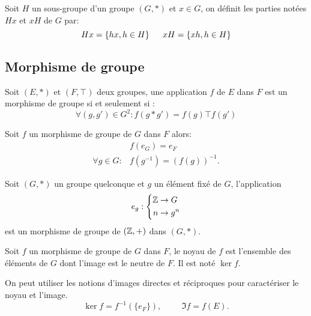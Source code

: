 \begin{defi}[Notations $Hx$ et $xH$.]
  Soit $H$ un sous-groupe d'un groupe $(G,*)$ et $x\in G$, on définit les parties notées $Hx$ et $xH$ de $G$ par:
\begin{displaymath}
  Hx = \left\lbrace hx, h\in H\right\rbrace \hspace{0.5cm} xH = \left\lbrace xh, h\in H\right\rbrace
\end{displaymath}
\end{defi}


\subsection{Morphisme de groupe}
\begin{defi}
 Soit $(E,*)$ et $(F,\top)$ deux groupes, une application $f$ de $E$ dans $F$ est un morphisme de groupe si et seulement si :
\begin{displaymath}
 \forall(g,g')\in G^2 : f(g*g') = f(g) \top f(g')
\end{displaymath}
\end{defi}
\begin{prop}
 Soit $f$ un morphisme de groupe de $G$ dans $F$ alors:
\begin{align*}
    &f(e_G) = e_F \\
 \forall g\in G: &f(g^{-1}) = (f(g))^{-1}.
\end{align*}
\end{prop}
\begin{exple}
 Soit $(G,*)$ un groupe quelconque et $g$ un élément fixé de $G$, l'application
\begin{displaymath}
e_g : \left\lbrace 
\begin{aligned}
 \mathbb{Z} &\rightarrow G \\
 n &\rightarrow g^n
\end{aligned}
\right. 
\end{displaymath}
est un morphisme de groupe de $(\mathbb{Z},+)$ dans $(G,*)$.
\end{exple}
\begin{defi}
Soit $f$ un morphisme de groupe de $G$ dans $F$, le noyau de $f$ est l'ensemble des éléments de $G$ dont l'image est le neutre de $F$. Il est noté $\ker f$.
\end{defi}
\begin{rem}
 On peut utiliser les notions d'images directes et réciproques pour caractériser le noyau et l'image.
\begin{displaymath}
 \ker f = f^{-1}(\{e_F\}),\hspace{1cm} \Im f = f(E) .
\end{displaymath}
\end{rem}

